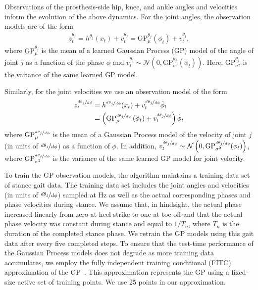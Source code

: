 Observations of the prosthesis-side hip, knee, and ankle angles and velocities
inform the evolution of the above dynamics. For the joint angles, the
observation models are of the form
\begin{align}
    z_t^{\theta_j} = h^{\theta_j}(x_t) + v_t^{\theta_j}
        = \mathrm{GP}_\mu^{\theta_j}\left(\phi_t \right) + v_t^{\theta_j},
\end{align}
where $\mathrm{GP}_\mu^{\theta_j}$ is the mean of a learned Gaussian Process
(GP) model of the angle of joint $j$ as a function of the phase $\phi$ and
$v_t^{\theta_j} \sim \mathcal{N} \left(0,
\mathrm{GP}_{\sigma^2}^{\theta_j}(\phi_t) \right)$. Here,
$\mathrm{GP}_{\sigma^2}^{\theta_j}$ is the variance of the same learned GP
model.

Similarly, for the joint velocities we use an observation model of the form
\begin{align}
    \begin{split}
        z_t^{\nicefrac{d \theta_j}{d \phi}}
            &= h^{\nicefrac{d \theta_j}{d \phi}}(x_t) 
                + v_t^{\nicefrac{d \theta_j}{d \phi}} \dot{\phi}_t \\
            &= \left( \mathrm{GP}_\mu^{\nicefrac{d \theta_j}{d \phi}} 
            \left(\phi_t \right) + v_t^{\nicefrac{d \theta_j}{d \phi}} \right) 
            \dot{\phi}_t
    \end{split}
\end{align}
where $\mathrm{GP}_\mu^{\nicefrac{d \theta_j}{d \phi}}$ is the mean of a
Gaussian Process model of the velocity of joint $j$ (in units of $\nicefrac{d
\theta_j}{d \phi}$) as a function of $\phi$. In addition, $v_t^{\nicefrac{d
\theta_j}{d \phi}} \sim \mathcal{N} \left(0, \mathrm{GP}_{\sigma^2}^{\nicefrac{d
\theta_j}{d \phi}}(\phi_t) \right)$, where $\mathrm{GP}_{\sigma^2}^{\nicefrac{d
\theta_j}{d \phi}}$ is the variance of the same learned GP model for joint
velocity.

To train the GP observation models, the algorithm maintains a training data set
of stance gait data. The training data set includes the joint angles and
velocities (in units of $\nicefrac{d \theta_j}{d\phi}$) sampled at
\unit[100]{Hz} as well as the actual corresponding phases and phase velocities
during stance. We assume that, in hindsight, the actual phase increased linearly
from zero at heel strike to one at toe off and that the actual phase velocity
was constant during stance and equal to $1/T_n$, where $T_n$ is the duration of
the completed stance phase. We retrain the GP models using this gait data after
every five completed steps. To ensure that the test-time performance of the
Gaussian Process models does not degrade as more training data accumulates, we
employ the fully independent training conditional (FITC) approximation of the
GP~\citep{snelson2007local}. This approximation represents the GP using a
fixed-size active set of training points. We use 25 points in our approximation.

